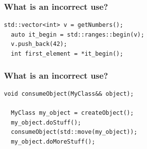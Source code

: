 \documentclass[aspectratio=169]{beamer}
\begin{document}
\begin{frame}[fragile]
  \frametitle{What is an incorrect use?}
  
  \begin{lstlisting}[style=cpp20]
  std::vector<int> v = getNumbers();
  auto it_begin = std::ranges::begin(v);
  v.push_back(42);
  int first_element = *it_begin();
  \end{lstlisting}
  
\end{frame}

\begin{frame}[fragile]
  \frametitle{What is an incorrect use?}
  
  \begin{lstlisting}[style=cpp20]
  void consumeObject(MyClass&& object);

  MyClass my_object = createObject();
  my_object.doStuff();
  consumeObject(std::move(my_object));
  my_object.doMoreStuff();
  \end{lstlisting}
  
\end{frame}
\end{document}
